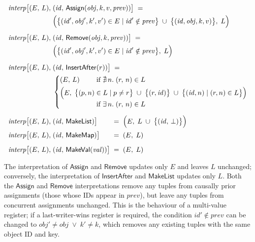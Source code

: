 \begin{align*}
    \mathit{interp}\big[(E,\, L),\; &(\mathit{id},\, \mathsf{Assign}(\mathit{obj}, k, v, \mathit{prev})) \big] \;=\\
    &\Big( \big\{ (\mathit{id}', \mathit{obj}', k', v') \in E \mid
    \mathit{id}' \notin \mathit{prev} \big\} \;\cup\;
    \big\{ (\mathit{id}, \mathit{obj}, k, v) \big\},\; L \Big) \\[5pt]
    \mathit{interp}\big[(E,\, L),\; &(\mathit{id},\, \mathsf{Remove}(\mathit{obj}, k, \mathit{prev})) \big] \;=\\
    &\Big( \big\{ (\mathit{id}', \mathit{obj}', k', v') \in E \mid
    \mathit{id}' \notin \mathit{prev} \big\},\; L \Big) \\[5pt]
    \mathit{interp}\big[(E,\, L),\; &(\mathit{id},\, \mathsf{InsertAfter}(r)) \big] \;=\\
    &\left\{
        \arraycolsep=0pt \def\arraystretch{1.2}
        \begin{array}{ll}
            (E,\, L) & \text{if } \nexists\,n.\; (r,\, n) \in L\\[3pt]
            \Big(E,\; \big\{ (p,n) \;&\in L \mid p \neq r \big\} \;\cup\;
            \big\{ (r, \mathit{id}) \big\} \;\cup\;
            \big\{ (\mathit{id}, n) \mid (r, n) \in L \big\} \Big)\\
            & \text{if } \exists\,n.\; (r,\,n) \in L
        \end{array} \right. \\[5pt]
    \mathit{interp}\big[(E,\, L),\; &(\mathit{id},\, \mathsf{MakeList}) \big] \hspace{21.1pt}=\;
    \Big( E,\; L \;\cup\; \big\{(\mathit{id},\, \bot)\big\}\Big) \\[1pt]
    \mathit{interp}\big[(E,\, L),\; &(\mathit{id},\, \mathsf{MakeMap}) \big] \hspace{17.6pt}=\; (E,\; L) \\[5pt]
    \mathit{interp}\big[(E,\, L),\; &(\mathit{id},\, \mathsf{MakeVal}(\mathit{val})) \big] \;=\; (E,\; L)
\end{align*}

The interpretation of $\mathsf{Assign}$ and $\mathsf{Remove}$ updates only $E$ and leaves $L$ unchanged; conversely, the interpretation of $\mathsf{InsertAfter}$ and $\mathsf{MakeList}$ updates only $L$.
Both the $\mathsf{Assign}$ and $\mathsf{Remove}$ interpretations remove any tuples from causally prior assignments (those whose IDs appear in $\mathit{prev}$), but leave any tuples from concurrent assignments unchanged.
This is the behaviour of a multi-value register; if a last-writer-wins register is required, the condition $\mathit{id}' \notin \mathit{prev}$ can be changed to $\mathit{obj}' \neq \mathit{obj} \;\vee\; k' \neq k$, which removes any existing tuples with the same object ID and key.

